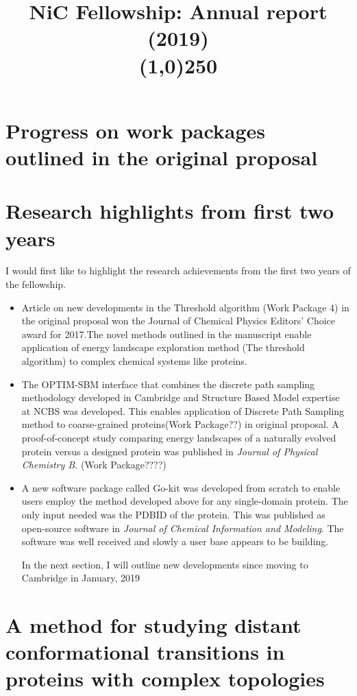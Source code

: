 \documentclass[a4paper,11pt]{article}
\title{ \vspace{-9ex}NiC Fellowship: Annual report (2019)\\\line(1,0){250}}
\date{\vspace{-11ex}}
\begin{document}
\maketitle
\section{Progress on work packages outlined in the original proposal}

\section{Research highlights from first two years}
I would first like to highlight the research achievements from the  first two years of the fellowship. 
\begin{itemize}
    \item {Article on new developments in the Threshold algorithm (Work Package 4) in the original proposal won the Journal of Chemical Physics Editors' Choice award for 2017.The novel methods outlined in the manuscript enable application of energy landscape exploration method (The threshold algorithm) to complex chemical systems like proteins.}
    \item{The OPTIM-SBM interface that combines the discrete path sampling methodology developed in Cambridge and Structure Based Model expertise at NCBS was developed.  This enables application of Discrete Path Sampling method to coarse-grained proteins(Work Package??) in original proposal. A proof-of-concept study comparing energy landscapes of a naturally evolved protein versus a designed protein was published in \textit{Journal of  Physical Chemistry B.} (Work Package????)}
    \item{A new software package called Go-kit was developed from scratch to enable users employ the method developed above for any single-domain protein. The only input needed was the PDBID of the protein. This was published as open-source software in \textit{Journal of Chemical Information and Modeling}. The software was well received and slowly a user base appears to be building.}
    
    In the next section, I will outline new developments since moving to Cambridge in January, 2019
    

\end{itemize}
\section{A method for studying distant conformational transitions in proteins with complex topologies}
\end{document}
